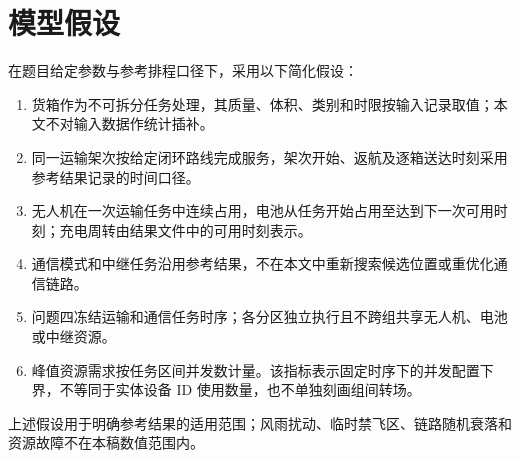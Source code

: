 \section{模型假设}
在题目给定参数与参考排程口径下，采用以下简化假设：
\begin{enumerate}
  \item 货箱作为不可拆分任务处理，其质量、体积、类别和时限按输入记录取值；本文不对输入数据作统计插补。
  \item 同一运输架次按给定闭环路线完成服务，架次开始、返航及逐箱送达时刻采用参考结果记录的时间口径。
  \item 无人机在一次运输任务中连续占用，电池从任务开始占用至达到下一次可用时刻；充电周转由结果文件中的可用时刻表示。
  \item 通信模式和中继任务沿用参考结果，不在本文中重新搜索候选位置或重优化通信链路。
  \item 问题四冻结运输和通信任务时序；各分区独立执行且不跨组共享无人机、电池或中继资源。
  \item 峰值资源需求按任务区间并发数计量。该指标表示固定时序下的并发配置下界，不等同于实体设备 ID 使用数量，也不单独刻画组间转场。
\end{enumerate}
上述假设用于明确参考结果的适用范围；风雨扰动、临时禁飞区、链路随机衰落和资源故障不在本稿数值范围内。
